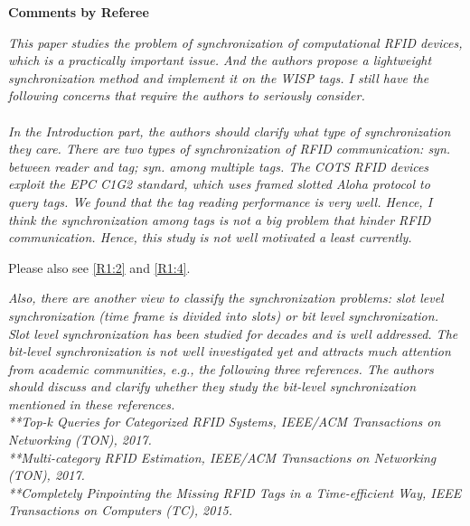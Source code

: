 \documentclass[10pt]{article}
\newcommand{\referee}[1]{
	{\item \color{OliveGreen} \emph{{#1}}}
	\label{R\therefereeCounter:\arabic{enumi}}
}
\newcommand{\response}[1]{{\color{blue} #1}}
\newcounter{refereeCounter}
\newenvironment{responses}{%
\refstepcounter{refereeCounter}%
\textbf{\large Comments by Referee \therefereeCounter}
\begin{enumerate}%
\renewcommand{\labelenumi}{\textbf{[R\therefereeCounter :\,\arabic{enumi}]}} %
}{\end{enumerate}}
\begin{document}
\begin{responses}
 
\referee{This paper studies the problem of synchronization of computational RFID devices, which is a practically important issue. And the authors propose a lightweight synchronization method and implement it on the WISP tags. I still have the following concerns that require the authors to seriously consider. \\
\\	
In the Introduction part, the authors should clarify what type of synchronization they care. There are two types of synchronization of RFID communication: syn. between reader and tag; syn. among multiple tags. The COTS RFID devices exploit the EPC C1G2 standard, which uses framed slotted Aloha protocol to query tags. We found that the tag reading performance is very well. Hence, I think the synchronization among tags is not a big problem that hinder RFID communication. Hence, this study is not well motivated a least currently.}

\response{
	Please also see \hyperref[R1:2]{[R1:2]} and \hyperref[R1:4]{[R1:4]}.
}

\referee{Also, there are another view to classify the synchronization problems: slot level synchronization (time frame is divided into slots) or bit level synchronization. Slot level synchronization has been studied for decades and is well addressed. The bit-level synchronization is not well investigated yet and attracts much attention from academic communities, e.g., the following three references. The authors should discuss and clarify whether they study the bit-level synchronization mentioned in these references. \\
**Top-k Queries for Categorized RFID Systems, IEEE/ACM Transactions on Networking (TON), 2017. \\
**Multi-category RFID Estimation, IEEE/ACM Transactions on Networking (TON), 2017. \\
**Completely Pinpointing the Missing RFID Tags in a Time-efficient Way, IEEE Transactions on Computers (TC), 2015.}


\end{responses}
\end{document}
